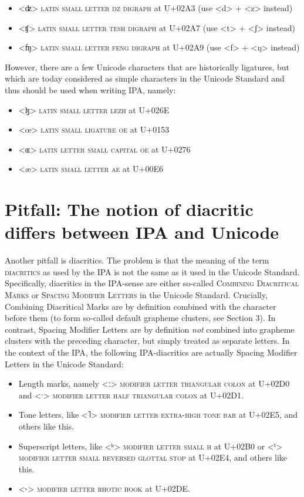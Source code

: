 \begin{itemize}
	\item <ʣ> \textsc{latin small letter dz digraph} at U+02A3 (use <d> + <z> instead) 
	\item <ʧ> \textsc{latin small letter tesh digraph} at U+02A7 (use <t> + <ʃ> instead) 
	\item <ʩ> \textsc{latin small letter feng digraph} at U+02A9 (use <f> + <ŋ> instead) 
\end{itemize}

However, there are a few Unicode characters that are historically ligatures, but which are today considered as simple characters in the Unicode Standard and thus should be used when writing IPA, namely:

\begin{itemize}
	\item <ɮ> \textsc{latin small letter lezh} at U+026E 
	\item <œ> \textsc{latin small ligature oe} at U+0153 
	\item <ɶ> \textsc{latin letter small capital oe} at U+0276 
	\item <æ> \textsc{latin small letter ae} at U+00E6 
\end{itemize}

\section{Pitfall: The notion of diacritic differs between IPA and Unicode}
\label{pitfall-the-ipa-notion-of-diacritics-is-not-the-same-as-the-unicode-standards-notion-of-diacritics}

Another pitfall is diacritics. The problem is that the meaning of the term \textsc{diacritics} as used by the IPA is not the same as it used in the Unicode Standard. Specifically, diacritics in the IPA-sense are either so-called \textsc{Combining Diacritical Marks} or \textsc{Spacing Modifier Letters} in the Unicode Standard. Crucially, Combining Diacritical Marks are by definition combined with the character before them (to form so-called default grapheme clusters, see Section 3). In contrast, Spacing Modifier Letters are by definition \emph{not} combined into grapheme clusters with the preceding character, but simply treated as separate letters. In the context of the IPA, the following IPA-diacritics are actually Spacing Modifier Letters in the Unicode Standard:

\begin{itemize}
	\item Length marks, namely <ː> \textsc{modifier letter triangular colon} at U+02D0 and <ˑ> \textsc{modifier letter half triangular colon} at U+02D1. 
	\item Tone letters, like <˥> \textsc{modifier letter extra-high tone bar} at U+02E5, and others like this. 
	\item Superscript letters, like <ʰ> \textsc{modifier letter small h} at U+02B0 or <ˤ> \textsc{modifier letter small reversed glottal stop} at U+02E4, and others like this. 
	\item <˞> \textsc{modifier letter rhotic hook} at U+02DE. 
\end{itemize}

